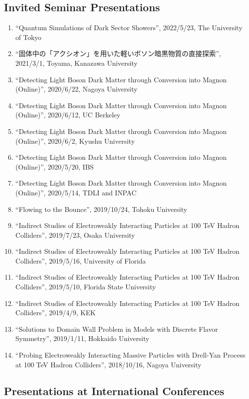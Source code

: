 \documentclass[12pt]{article}
\begin{document}
\subsection*{Invited Seminar Presentations}
\begin{enumerate}
 \item ``Quantum Simulations of Dark Sector Showers'', 2022/5/23, The University of Tokyo
 \item ``固体中の「アクシオン」を用いた軽いボソン暗黒物質の直接探索'', 2021/3/1, Toyama, Kanazawa University
 \item ``Detecting Light Boson Dark Matter through Conversion into Magnon (Online)'', 2020/6/22, Nagoya University
 \item ``Detecting Light Boson Dark Matter through Conversion into Magnon (Online)'', 2020/6/12, UC Berkeley
 \item ``Detecting Light Boson Dark Matter through Conversion into Magnon (Online)'', 2020/6/2, Kyushu University
 \item ``Detecting Light Boson Dark Matter through Conversion into Magnon (Online)'', 2020/5/20, IBS
 \item ``Detecting Light Boson Dark Matter through Conversion into Magnon (Online)'', 2020/5/14, TDLI and INPAC
 \item ``Flowing to the Bounce'', 2019/10/24, Tohoku University
 \item ``Indirect Studies of Electroweakly Interacting Particles at 100 TeV Hadron Colliders'', 2019/7/23, Osaka University
 \item ``Indirect Studies of Electroweakly Interacting Particles at 100 TeV Hadron Colliders'', 2019/5/16, University of Florida
 \item ``Indirect Studies of Electroweakly Interacting Particles at 100 TeV Hadron Colliders'', 2019/5/10, Florida State University
 \item ``Indirect Studies of Electroweakly Interacting Particles at 100 TeV Hadron Colliders'', 2019/4/9, KEK
 \item ``Solutions to Domain Wall Problem in Models with Discrete Flavor Symmetry'', 2019/1/11, Hokkaido University
 \item ``Probing Electroweakly Interacting Massive Particles with Drell-Yan Process at 100 TeV Hadron Colliders'', 2018/10/16, Nagoya University
\end{enumerate}

\subsection*{Presentations at International Conferences}
\end{document}

